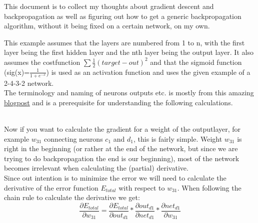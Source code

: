 \documentclass[11pt, halfparskip]{article}
\begin{document}
\noindent This document is to collect my thoughts about gradient descent and backpropagation as well as figuring out how to get a generic backpropagation algorithm, without
it being fixed on a certain network, on my own.

\noindent This example assumes that the layers are numbered from 1 to n, with the first layer being the first hidden layer and the nth layer being the output layer.
It also assumes the costfunction $\sum \frac{1}{2}(target - out)^2$ and that the sigmoid function (sig(x)=$\frac{1}{1 + e^{-x}}$) is used as an activation function and
uses the given example of a 2-4-3-2 network.\\
The terminology and naming of neurons outputs etc. is mostly from this amazing \href{https://mattmazur.com/2015/03/17/a-step-by-step-backpropagation-example}{blogpost}
and is a prerequisite for understanding the following calculations.

\noindent\\
Now if you want to calculate the gradient for a weight of the outputlayer, for example $w_{31}$ connecting neurons $c_1$ and $d_1$, this is fairly simple. Weight
$w_{31}$ is right in the beginning (or rather at the end of the network, but since we are trying to do backpropagation the end is our beginning), most of the network
becomes irrelevant when calculating the (partial) derivative.\\
Since out intention is to minimize the error we will need to calculate the derivative of the error function $E_{total}$ with respect to $w_{31}$. When following the chain rule to calculate 
the derivative we get:
    \begin{equation}
	\frac{\partial E_{total}}{\partial w_{31}} = \frac{\partial E_{total}}{\partial out_{d1}} * \frac{\partial out_{d1}}{\partial net_{d1}} * \frac{\partial net_{d1}}{\partial w_{31}}
    \end{equation}
    
\end{document}
